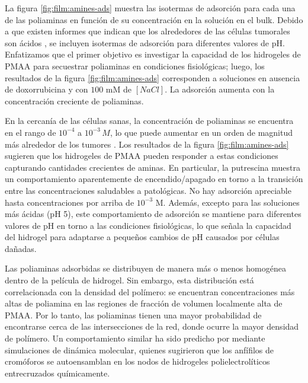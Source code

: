 La figura  \ref{fig:film:amines-ads} muestra las isotermas de adsorci\'on para cada una de las poliaminas en funci\'on de su concentraci\'on en la soluci\'on en el bulk. Debido a que existen informes que indican que los alrededores de las c\'elulas tumorales son \'acidos \cite{vaupel1989blood,tannock1989acid,Raghunand1999, rofstad2006acidic, schmaljohann2006thermo, Koltai2016}, se incluyen isotermas de adsorci\'on para diferentes valores de pH. Enfatizamos que el primer objetivo es investigar la capacidad de los hidrogeles de PMAA para secuestrar poliaminas en condiciones fisiol\'ogicas; luego, los resultados de la figura \ref{fig:film:amines-ads} corresponden a soluciones en ausencia de doxorrubicina y con $100$ mM de $[NaCl]$. La adsorci\'on aumenta con la concentraci\'on creciente de poliaminas. %

En la cercan\'ia de las c\'elulas sanas, la concentraci\'on de poliaminas se encuentra en el rango de $10^{-4}$ a $10^{-3}\, M$, lo que puede aumentar en un orden de magnitud m\'as alrededor de los tumores \cite{Soda2011}. Los resultados de la figura \ref{fig:film:amines-ads} sugieren que los hidrogeles de PMAA pueden responder a estas condiciones capturando cantidades crecientes de aminas. En particular, la putrescina muestra un comportamiento aparentemente de encendido/apagado en torno a la transici\'on entre las concentraciones saludables a patol\'ogicas. No hay adsorci\'on apreciable hasta concentraciones por arriba de $10^{-3}$ M. Adem\'as, excepto para las soluciones m\'as \'acidas (pH 5), este comportamiento de adsorci\'on se mantiene para diferentes valores de pH en torno a las condiciones fisiol\'ogicas, lo que se\~nala  la capacidad del hidrogel para adaptarse a peque\~nos cambios de pH causados por c\'elulas da\~nadas.

Las poliaminas adsorbidas se distribuyen de manera m\'as o menos homog\'enea dentro de la pel\'icula de hidrogel. Sin embargo, esta distribuci\'on est\'a correlacionada con la densidad del pol\'imero: se encuentran concentraciones m\'as altas de poliamina en las regiones de fracci\'on de volumen localmente alta de PMAA. Por lo tanto, las poliaminas tienen una mayor probabilidad de encontrarse cerca de las intersecciones de la red, donde ocurre la mayor densidad de pol\'imero. Un comportamiento similar ha sido predicho por  \citet{Sai2020} mediante simulaciones de din\'amica molecular, quienes sugirieron que los anf\'ifilos de crom\'oforos se autoensamblan en los nodos de hidrogeles polielectrol\'iticos entrecruzados qu\'imicamente.


